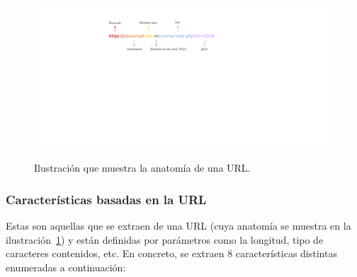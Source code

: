 \begin{figure}[h]
	\caption[\textit{Phishing}: Anatomía de una URL.]{Ilustración que muestra la anatomía de una URL.}
	\centering
	\includegraphics[scale=1]{../img/memoria/5_url_anatomia.pdf}
	\label{img:5_url_anatomia}
\end{figure}


\subsubsection{Características basadas en la URL}
Estas son aquellas que se extraen de una URL (cuya anatomía se muestra en la ilustración~\ref{img:5_url_anatomia}) y están definidas por parámetros como la longitud, tipo de caracteres contenidos, etc. En concreto, se extraen 8 características distintas enumeradas a continuación:

